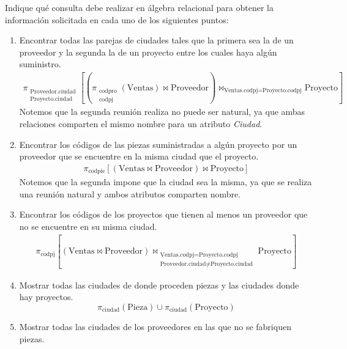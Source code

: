 \begin{ejercicio}
    Indique qué consulta debe realizar en álgebra relacional para obtener la información solicitada en cada uno de los siguientes puntos:
    \begin{enumerate}
        \item Encontrar todas las parejas de ciudades tales que la primera sea la de un proveedor y la segunda la de un proyecto entre los cuales haya algún suministro.
        \begin{align*}
            \pi_{\substack{\text{Proveedor.ciudad}\\\text{Proyecto.ciudad}}}\left[\left(\pi_{\substack{\text{codpro}\\\text{codpj}}}(\text{Ventas})\bowtie \text{Proveedor}\right)\bowtie_{\text{Ventas.codpj}=\text{Proyecto.codpj}} \text{Proyecto}\right]
        \end{align*}
        Notemos que la segunda reunión realiza no puede ser natural, ya que ambas relaciones comparten el mismo nombre para un atributo \emph{Ciudad}.
        \item Encontrar los códigos de las piezas suministradas a algún proyecto por un proveedor que se encuentre en la misma ciudad que el proyecto.
        \begin{align*}
            \pi_{\text{codpie}}\left[\left(\text{Ventas}\bowtie \text{Proveedor}\right)\bowtie \text{Proyecto}\right]
        \end{align*}
        Notemos que la segunda impone que la ciudad sea la misma, ya que se realiza una reunión natural y ambos atributos comparten nombre.
        \item Encontrar los códigos de los proyectos que tienen al menos un proveedor que no se encuentre en su misma ciudad.
        \begin{align*}
            \pi_{\text{codpj}}\left[\left(\text{Ventas}\bowtie \text{Proveedor}\right)\bowtie_{\substack{\text{Ventas.codpj}=\text{Proyecto.codpj}\\\text{Proveedor.ciudad}\neq \text{Proyecto.ciudad}}} \text{Proyecto}\right]
        \end{align*}
        \item Mostrar todas las ciudades de donde proceden piezas y las ciudades donde hay proyectos.
        \begin{equation*}
            \pi_{\text{ciudad}}(\text{Pieza}) \cup \pi_{\text{ciudad}}(\text{Proyecto})
        \end{equation*}
        \item Mostrar todas las ciudades de los proveedores en las que no se fabriquen piezas.

\end{enumerate}
\end{ejercicio}
